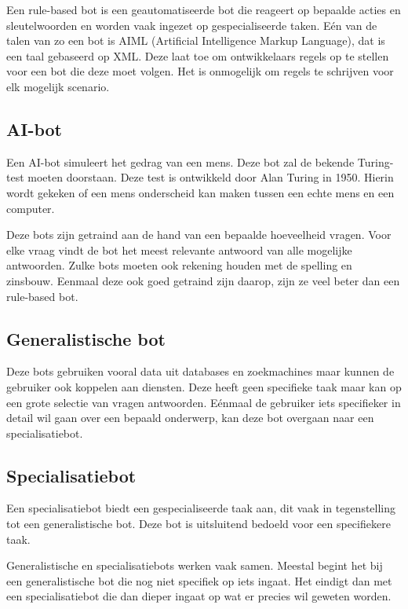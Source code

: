 Een rule-based bot is een geautomatiseerde bot die reageert op bepaalde acties en sleutelwoorden en worden vaak ingezet op gespecialiseerde taken. Eén van de talen van zo een bot is AIML (Artificial Intelligence Markup Language), dat is een taal gebaseerd op XML. Deze laat toe om ontwikkelaars regels op te stellen voor een bot die deze moet volgen. Het is onmogelijk om regels te schrijven voor elk mogelijk scenario. ~\autocite{Kumar2017}

\subsection{AI-bot}
\label{AI-bot}

Een AI-bot simuleert het gedrag van een mens. Deze bot zal de bekende Turing-test moeten doorstaan. Deze test is ontwikkeld door Alan Turing in 1950. Hierin wordt gekeken of een mens onderscheid kan maken tussen een echte mens en een computer.

Deze bots zijn getraind aan de hand van een bepaalde hoeveelheid vragen. Voor elke vraag vindt de bot het meest relevante antwoord van alle mogelijke antwoorden. Zulke bots moeten ook rekening houden met de spelling en zinsbouw. Eenmaal deze ook goed getraind zijn daarop, zijn ze veel beter dan een rule-based bot.

\subsection{Generalistische bot}
\label{Generalistische bot}

Deze bots gebruiken vooral data uit databases en zoekmachines maar kunnen de gebruiker ook koppelen aan diensten. Deze heeft geen specifieke taak maar kan op een grote selectie van vragen antwoorden. Eénmaal de gebruiker iets specifieker in detail wil gaan over een bepaald onderwerp, kan deze bot overgaan naar een specialisatiebot.

\subsection{Specialisatiebot}
\label{Specialisatiebot}

Een specialisatiebot biedt een gespecialiseerde taak aan, dit vaak in tegenstelling tot een generalistische bot. Deze bot is uitsluitend bedoeld voor een specifiekere taak.

Generalistische en specialisatiebots werken vaak samen. Meestal begint het bij een generalistische bot die nog niet specifiek op iets ingaat. Het eindigt dan met een specialisatiebot die dan dieper ingaat op wat er precies wil geweten worden.

